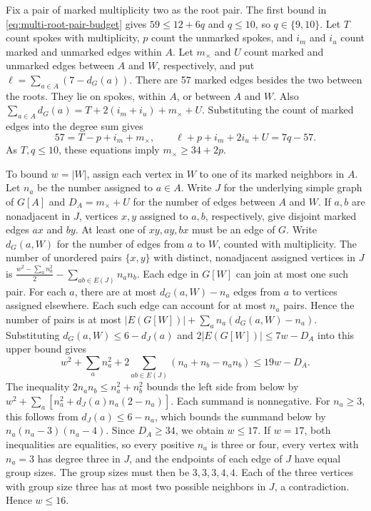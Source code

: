 \documentclass[preprint,11pt,numbers]{elsarticle-arxiv}
\numberwithin{equation}{section}
\theoremstyle{definition}
\begin{document}
Fix a pair of marked multiplicity two as the root pair. The
first bound in \eqref{eq:multi-root-pair-budget} gives
$59\leq12+6q$ and $q\leq10$, so $q\in\{9,10\}$.
Let $T$ count spokes with multiplicity, $p$ count the
unmarked spokes, and $i_m$ and $i_u$ count marked and
unmarked edges within $A$. Let $m_\times$ and $U$ count
marked and unmarked edges between $A$ and $W$, respectively,
and put $\ell=\sum_{a\in A}(7-d_G(a))$. There are 57 marked
edges besides the two between the roots. They lie on
spokes, within $A$, or between $A$ and $W$. Also
$\sum_{a\in A}d_G(a)=T+2(i_m+i_u)+m_\times+U$. Substituting
the count of marked edges into the degree sum gives
\begin{equation}\label{eq:multi-seven-counts}
 57=T-p+i_m+m_\times,\qquad
 \ell+p+i_m+2i_u+U=7q-57.
\end{equation}
As $T,q\le10$, these equations imply $m_\times\ge34+2p$.

To bound $w=|W|$, assign each vertex in $W$ to one of its
marked neighbors in $A$. Let $n_a$ be the number assigned
to $a\in A$. Write $J$ for the underlying simple graph of $G[A]$
and $D_A=m_\times+U$ for the number of edges between $A$
and $W$. If $a,b$ are nonadjacent in $J$, vertices $x,y$
assigned to $a,b$, respectively, give disjoint marked edges
$ax$ and $by$. At least one of $xy,ay,bx$ must be an edge of $G$. Write $d_G(a,W)$ for the number of edges from $a$ to $W$,
counted with multiplicity. The number of unordered pairs $\{x,y\}$
with distinct, nonadjacent assigned vertices in $J$ is
$\frac{w^2-\sum_a n_a^2}{2}-\sum_{ab\in E(J)}n_an_b$.
Each edge in $G[W]$ can join at most one such pair. For each
$a$, there are at most $d_G(a,W)-n_a$ edges from $a$ to
vertices assigned elsewhere. Each such edge can account for
at most $n_a$ pairs. Hence the number of pairs is at most
$|E(G[W])|+\sum_a n_a(d_G(a,W)-n_a)$. Substituting
$d_G(a,W)\leq6-d_J(a)$ and $2|E(G[W])|\leq7w-D_A$
into this upper bound gives
\[
 w^2+\sum_a n_a^2+2\sum_{ab\in E(J)}(n_a+n_b-n_an_b)
 \le 19w-D_A.
\]
The inequality $2n_an_b\le n_a^2+n_b^2$ bounds the
left side from below by $w^2+\sum_a[n_a^2+d_J(a)n_a(2-n_a)]$.
Each summand is nonnegative. For $n_a\ge3$, this follows
from $d_J(a)\le6-n_a$, which bounds the summand below
by $n_a(n_a-3)(n_a-4)$. Since $D_A\ge34$, we obtain
$w\le17$. If $w=17$, both inequalities are equalities, so
every positive $n_a$ is three or four, every vertex with
$n_a=3$ has degree three in $J$, and the endpoints of each
edge of $J$ have equal group sizes. The group sizes must
then be $3,3,3,4,4$. Each of the three vertices with group
size three has at most two possible neighbors in $J$, a
contradiction. Hence $w\le16$.
\end{document}
